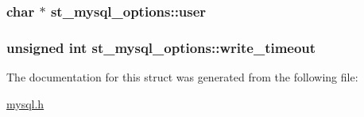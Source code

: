 \subsubsection[{user}]{\setlength{\rightskip}{0pt plus 5cm}char $\ast$ st\+\_\+mysql\+\_\+options\+::user}\label{structst__mysql__options_a9889ada2bcc6e077b8ee984a9c7be6e1}
\hypertarget{structst__mysql__options_a8956fca97f0263e415546f5624a614d2}{}
\subsubsection[{write\+\_\+timeout}]{\setlength{\rightskip}{0pt plus 5cm}unsigned int st\+\_\+mysql\+\_\+options\+::write\+\_\+timeout}\label{structst__mysql__options_a8956fca97f0263e415546f5624a614d2}


The documentation for this struct was generated from the following file\+:\begin{DoxyCompactItemize}
\item 
\hyperlink{mysql_8h}{mysql.\+h}\end{DoxyCompactItemize}
